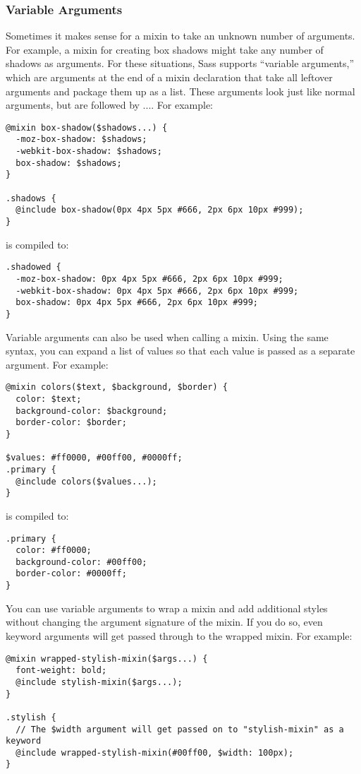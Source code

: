 \documentclass[10pt]{article}
\begin{document}
\subsubsection{Variable Arguments}


 Sometimes it makes sense for a mixin to take an unknown number of arguments. For example, a mixin for creating box shadows might take any number of shadows as arguments. For these situations, Sass supports “variable arguments,” which are arguments at the end of a mixin declaration that take all leftover arguments and package them up as a list. These arguments look just like normal arguments, but are followed by .... For example:
\begin{verbatim}
@mixin box-shadow($shadows...) {
  -moz-box-shadow: $shadows;
  -webkit-box-shadow: $shadows;
  box-shadow: $shadows;
}

.shadows {
  @include box-shadow(0px 4px 5px #666, 2px 6px 10px #999);
}
\end{verbatim}


 is compiled to:
\begin{verbatim}
.shadowed {
  -moz-box-shadow: 0px 4px 5px #666, 2px 6px 10px #999;
  -webkit-box-shadow: 0px 4px 5px #666, 2px 6px 10px #999;
  box-shadow: 0px 4px 5px #666, 2px 6px 10px #999;
}
\end{verbatim}


 Variable arguments can also be used when calling a mixin. Using the same syntax, you can expand a list of values so that each value is passed as a separate argument. For example:
\begin{verbatim}
@mixin colors($text, $background, $border) {
  color: $text;
  background-color: $background;
  border-color: $border;
}

$values: #ff0000, #00ff00, #0000ff;
.primary {
  @include colors($values...);
}
\end{verbatim}


 is compiled to:
\begin{verbatim}
.primary {
  color: #ff0000;
  background-color: #00ff00;
  border-color: #0000ff;
}
\end{verbatim}


 You can use variable arguments to wrap a mixin and add additional styles without changing the argument signature of the mixin. If you do so, even keyword arguments will get passed through to the wrapped mixin. For example:
\begin{verbatim}
@mixin wrapped-stylish-mixin($args...) {
  font-weight: bold;
  @include stylish-mixin($args...);
}

.stylish {
  // The $width argument will get passed on to "stylish-mixin" as a keyword
  @include wrapped-stylish-mixin(#00ff00, $width: 100px);
}
\end{verbatim}
\end{document}
